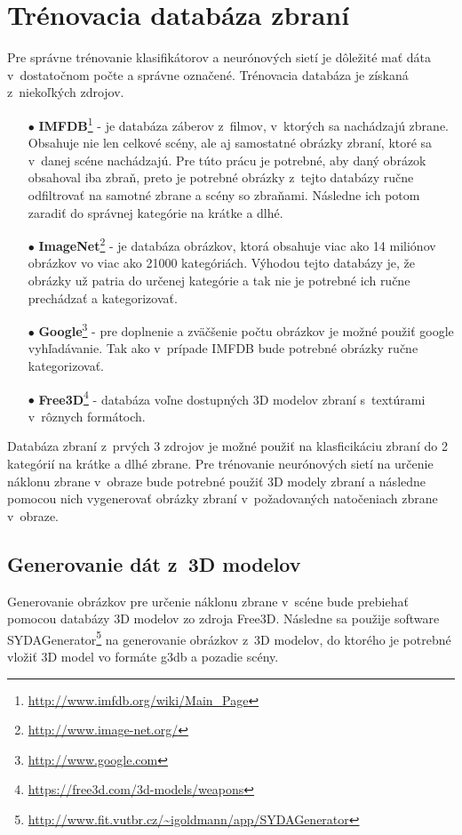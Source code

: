 
\section{Trénovacia databáza zbraní}
\label{sec:databaza}
Pre správne trénovanie klasifikátorov a neurónových sietí je dôležité mať dáta v~dostatočnom počte a správne označené.
Trénovacia databáza je získaná z~niekoľkých zdrojov.
\begin{enumerate}
    \item[$\bullet$] \textbf{IMFDB}\footnote{\url{http://www.imfdb.org/wiki/Main_Page}} - je databáza záberov z~filmov, v~ktorých sa nachádzajú zbrane.
    Obsahuje nie len celkové scény, ale aj samostatné obrázky zbraní, ktoré sa v~danej scéne nachádzajú.
    Pre túto prácu je potrebné, aby daný obrázok obsahoval iba zbraň, preto je potrebné obrázky z~tejto databázy ručne odfiltrovať na samotné zbrane a scény so zbraňami.
    Následne ich potom zaradiť do správnej kategórie na krátke a dlhé.
    \item[$\bullet$] \textbf{ImageNet}\footnote{\url{http://www.image-net.org/}} - je databáza obrázkov, ktorá obsahuje viac ako 14 miliónov obrázkov vo viac ako 21000 kategóriách.
    Výhodou tejto databázy je, že obrázky už patria do určenej kategórie a tak nie je potrebné ich ručne prechádzať a kategorizovať.
    \item[$\bullet$] \textbf{Google}\footnote{\url{http://www.google.com}} - pre doplnenie a zväčšenie počtu obrázkov je možné použiť google vyhľadávanie.
    Tak ako v~prípade IMFDB bude potrebné obrázky ručne kategorizovať.
    \item[$\bullet$] \textbf{Free3D}\footnote{\url{https://free3d.com/3d-models/weapons}} - databáza voľne dostupných 3D modelov zbraní s~textúrami v~rôznych formátoch.
\end{enumerate}

Databáza zbraní z~prvých 3 zdrojov je možné použiť na klasficikáciu zbraní do 2 kategórií na krátke a dlhé zbrane.
Pre trénovanie neurónových sietí na určenie náklonu zbrane v~obraze bude potrebné použiť 3D modely zbraní a následne pomocou nich vygenerovať
    obrázky zbraní v~požadovaných natočeniach zbrane v~obraze.

\subsection{Generovanie dát z~3D modelov}
\label{subsec:generovanie3d}
Generovanie obrázkov pre určenie náklonu zbrane v~scéne bude prebiehať pomocou databázy 3D modelov zo zdroja Free3D.
Následne sa použije software SYDAGenerator\footnote{\url{http://www.fit.vutbr.cz/~igoldmann/app/SYDAGenerator}} na generovanie obrázkov z~3D modelov,
    do ktorého je potrebné vložiť 3D model vo formáte g3db a pozadie scény.

